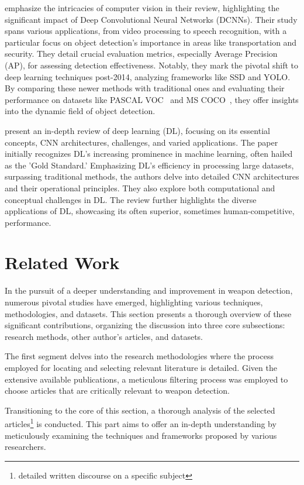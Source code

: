 \citet{rfc9} emphasize the intricacies of computer vision in their review, highlighting the significant impact of Deep Convolutional Neural Networks (DCNNs). Their study spans various applications, from video processing to speech recognition, with a particular focus on object detection's importance in areas like transportation and security. They detail crucial evaluation metrics, especially Average Precision (AP), for assessing detection effectiveness. Notably, they mark the pivotal shift to deep learning techniques post-2014, analyzing frameworks like SSD and YOLO. By comparing these newer methods with traditional ones and evaluating their performance on datasets like PASCAL VOC~\cite{rfc27} and MS COCO~\cite{rfc16}, they offer insights into the dynamic field of object detection.

\citet{rfc10} present an in-depth review of deep learning (DL), focusing on its essential concepts, CNN architectures, challenges, and varied applications. The paper initially recognizes DL's increasing prominence in machine learning, often hailed as the 'Gold Standard.' Emphasizing DL's efficiency in processing large datasets, surpassing traditional methods, the authors delve into detailed CNN architectures and their operational principles. They also explore both computational and conceptual challenges in DL. The review further highlights the diverse applications of DL, showcasing its often superior, sometimes human-competitive, performance.

\section{Related Work}
In the pursuit of a deeper understanding and improvement in weapon detection, numerous pivotal studies have emerged, highlighting various techniques, methodologies, and datasets. This section presents a thorough overview of these significant contributions, organizing the discussion into three core subsections: research methods, other author's articles, and datasets.

The first segment delves into the research methodologies where the process employed for locating and selecting relevant literature is detailed. Given the extensive available publications, a meticulous filtering process was employed to choose articles that are critically relevant to weapon detection.

Transitioning to the core of this section, a thorough analysis of the selected articles\footnote{detailed written discourse on a specific subject} is conducted. This part aims to offer an in-depth understanding by meticulously examining the techniques and frameworks proposed by various researchers.

